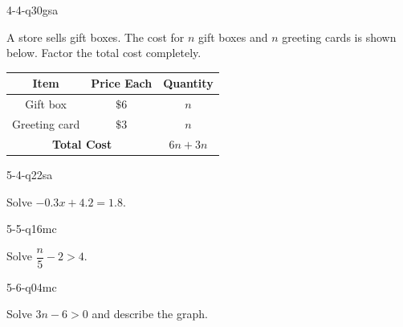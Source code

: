 \begin{practiceQuestion}{4-4-q30}{gsa}
\begin{questionText}
A store sells gift boxes. The cost for $n$ gift boxes and $n$ greeting cards is shown below. Factor the total cost completely.

\begin{center}
\begin{tabular}{|c|c|c|}
\hline
\textbf{Item} & \textbf{Price Each} & \textbf{Quantity} \\
\hline
Gift box & $\$6$ & $n$ \\
\hline
Greeting card & $\$3$ & $n$ \\
\hline
\multicolumn{2}{|c|}{\textbf{Total Cost}} & $6n + 3n$ \\
\hline
\end{tabular}
\end{center}
\end{questionText}
\end{practiceQuestion}

\begin{practiceQuestion}{5-4-q22}{sa}
\begin{questionText}
Solve $-0.3x + 4.2 = 1.8$.
\end{questionText}
\end{practiceQuestion}

\begin{practiceQuestion}{5-5-q16}{mc}
\begin{questionText}
Solve $\dfrac{n}{5} - 2 > 4$.
\end{questionText}
\end{practiceQuestion}

\begin{practiceQuestion}{5-6-q04}{mc}
\begin{questionText}
Solve $3n - 6 > 0$ and describe the graph.
\end{questionText}
\end{practiceQuestion}

